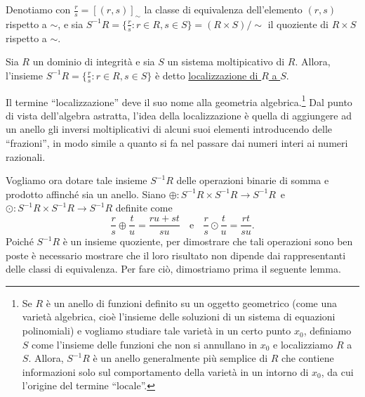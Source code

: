 \noindent Denotiamo con $\frac{r}{s}=[(r,s)]_{\sim}$ la classe di equivalenza dell'elemento $(r,s)$ rispetto a $\sim$, e sia $S^{-1}R=\{\frac{r}{s}: r\in R,s\in S\}=(R\times S)/{\sim}$ il quoziente di $R\times S$ rispetto a $\sim$.

\begin{defn}[]{}
Sia $R$ un dominio di integrità e sia $S$ un sistema moltipicativo di $R$. Allora, l'insieme $S^{-1}R=\{\frac{r}{s}: r\in R,s\in S\}$ è detto \underline{localizzazione di $R$ a $S$}.
\end{defn}

\noindent Il termine ``localizzazione'' deve il suo nome alla geometria algebrica.\footnote{Se $R$ è un anello di funzioni definito su un oggetto geometrico (come una varietà algebrica, cioè l'insieme delle soluzioni di un sistema di equazioni polinomiali) e vogliamo studiare tale varietà in un certo punto $x_0$, definiamo $S$ come l'insieme delle funzioni che non si annullano in $x_0$ e localizziamo $R$ a $S$. Allora, $S^{-1}R$ è un anello generalmente più semplice di $R$ che contiene informazioni solo sul comportamento della varietà in un intorno di $x_0$, da cui l'origine del termine ``locale''.} Dal punto di vista dell'algebra astratta, l'idea della localizzazione è quella di aggiungere ad un anello gli inversi moltiplicativi di alcuni suoi elementi introducendo delle ``frazioni'', in modo simile a quanto si fa nel passare dai numeri interi ai numeri razionali.

\noindent  Vogliamo ora dotare tale insieme $S^{-1}R$ delle operazioni binarie di somma e prodotto affinché sia un anello. Siano $\oplus\colon S^{-1}R\times S^{-1}R\to S^{-1}R$\, e \,$\odot \colon S^{-1}R\times S^{-1}R\to S^{-1}R$ definite come \[ \frac{r}{s}\oplus\frac{t}{u}=\frac{ru+st}{su} \ \ \, \text{ e } \, \ \ \frac{r}{s}\odot \frac{t}{u}=\frac{rt}{su}. \] Poiché $S^{-1}R$ è un insieme quoziente, per dimostrare che tali operazioni sono ben poste è necessario mostrare che il loro risultato non dipende dai rappresentanti delle classi di equivalenza. Per fare ciò, dimostriamo prima il seguente lemma.

